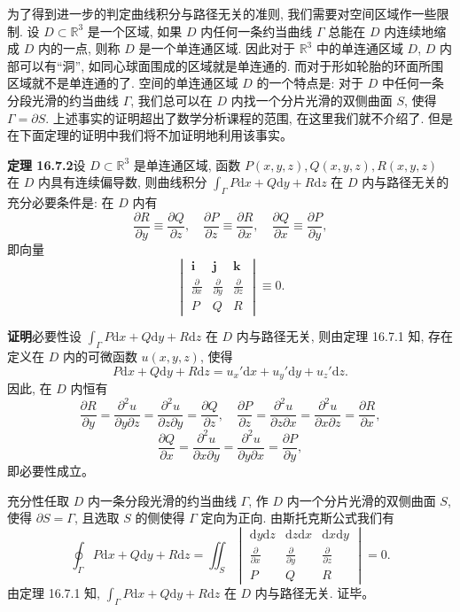 \documentclass[UTF8,12pt,a4paper,fontset=fandol]{ctexart}
\begin{document}
为了得到进一步的判定曲线积分与路径无关的准则, 我们需要对空间区域作一些限制. 设 $D\subset\mathbb R^3$ 是一个区域, 如果 $D$ 内任何一条约当曲线 $\Gamma$ 总能在 $D$ 内连续地缩成 $D$ 内的一点, 则称 $D$ 是一个单连通区域. 因此对于 $\mathbb R^3$ 中的单连通区域 $D$, $D$ 内部可以有“洞”, 如同心球面围成的区域就是单连通的. 而对于形如轮胎的环面所围区域就不是单连通的了. 空间的单连通区域 $D$ 的一个特点是: 对于 $D$ 中任何一条分段光滑的约当曲线 $\Gamma$, 我们总可以在 $D$ 内找一个分片光滑的双侧曲面 $S$, 使得 $\Gamma=\partial S$. 上述事实的证明超出了数学分析课程的范围, 在这里我们就不介绍了. 但是在下面定理的证明中我们将不加证明地利用该事实。

\noindent\textbf{定理 16.7.2}\quad 设 $D\subset\mathbb R^3$ 是单连通区域, 函数 $P(x,y,z),Q(x,y,z),R(x,y,z)$ 在 $D$ 内具有连续偏导数, 则曲线积分 $\int_\Gamma P\mathrm dx+Q\mathrm dy+R\mathrm dz$ 在 $D$ 内与路径无关的充分必要条件是: 在 $D$ 内有
\[
  \frac{\partial R}{\partial y}\equiv\frac{\partial Q}{\partial z},
  \quad
  \frac{\partial P}{\partial z}\equiv\frac{\partial R}{\partial x},
  \quad
  \frac{\partial Q}{\partial x}\equiv\frac{\partial P}{\partial y},
\]
即向量
\[
  \begin{vmatrix}
    \boldsymbol i&\boldsymbol j&\boldsymbol k\\
    \frac{\partial}{\partial x}&\frac{\partial}{\partial y}&\frac{\partial}{\partial z}\\
    P&Q&R
  \end{vmatrix}
  \equiv0.
\]

\noindent\textbf{证明}\quad 必要性\quad 设 $\int_\Gamma P\mathrm dx+Q\mathrm dy+R\mathrm dz$ 在 $D$ 内与路径无关, 则由定理 16.7.1 知, 存在定义在 $D$ 内的可微函数 $u(x,y,z)$, 使得
\[
  P\mathrm dx+Q\mathrm dy+R\mathrm dz=u_x'\mathrm dx+u_y'\mathrm dy+u_z'\mathrm dz.
\]
因此, 在 $D$ 内恒有
\[
  \frac{\partial R}{\partial y}
  =\frac{\partial^2u}{\partial y\partial z}
  =\frac{\partial^2u}{\partial z\partial y}
  =\frac{\partial Q}{\partial z},
  \quad
  \frac{\partial P}{\partial z}
  =\frac{\partial^2u}{\partial z\partial x}
  =\frac{\partial^2u}{\partial x\partial z}
  =\frac{\partial R}{\partial x},
\]
\[
  \frac{\partial Q}{\partial x}
  =\frac{\partial^2u}{\partial x\partial y}
  =\frac{\partial^2u}{\partial y\partial x}
  =\frac{\partial P}{\partial y},
\]
即必要性成立。

充分性\quad 任取 $D$ 内一条分段光滑的约当曲线 $\Gamma$, 作 $D$ 内一个分片光滑的双侧曲面 $S$, 使得 $\partial S=\Gamma$, 且选取 $S$ 的侧使得 $\Gamma$ 定向为正向. 由斯托克斯公式我们有
\[
  \oint_\Gamma P\mathrm dx+Q\mathrm dy+R\mathrm dz
  =
  \iint_S
  \begin{vmatrix}
    \mathrm dy\mathrm dz&\mathrm dz\mathrm dx&\mathrm dx\mathrm dy\\
    \frac{\partial}{\partial x}&\frac{\partial}{\partial y}&\frac{\partial}{\partial z}\\
    P&Q&R
  \end{vmatrix}
  =0.
\]
由定理 16.7.1 知, $\int_\Gamma P\mathrm dx+Q\mathrm dy+R\mathrm dz$ 在 $D$ 内与路径无关. 证毕。
\end{document}
